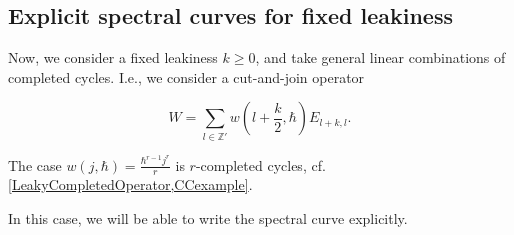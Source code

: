 \documentclass[10pt,a4paper,oneside,no-math,reqno]{amsart}%
\theoremstyle{plain}
\newtheorem{corollary}[theorem]{Corollary}
\theoremstyle{definition}
\theoremstyle{remark}
\numberwithin{equation}{section}
\renewcommand{\phi}{\varphi}
\newcommand{\mb}[1]{\mathbb{#1}}
\newcommand{\mc}[1]{\mathcal{#1}}
\newcommand{\1}{\mathds{1}}
\newcommand{\Z}{\mb{Z}}
\newcommand{\<}{\langle}
\renewcommand{\>}{\rangle}
\newcommand{\del}{\partial}
\DeclareMathOperator{\ad}{ad}
\begin{document}
	



\subsection{Explicit spectral curves for fixed leakiness}
\label{CurvesForFixedk}

Now, we consider a fixed leakiness $k \geq 0$, and take general linear combinations of  completed cycles. I.e., we consider a cut-and-join operator

\begin{equation}\label{CJ}
	W = \sum_{l \in \Z'} w (l + \frac{k}{2}, \hbar) E_{l + k,l}.
\end{equation}

The case $ w(j, \hbar) = \frac{\hbar^{r-1} j^r}{r} $ is $r$-completed cycles, cf. \cref{LeakyCompletedOperator,CCexample}.

In this case, we will be able to write the spectral curve explicitly.



\end{document}
